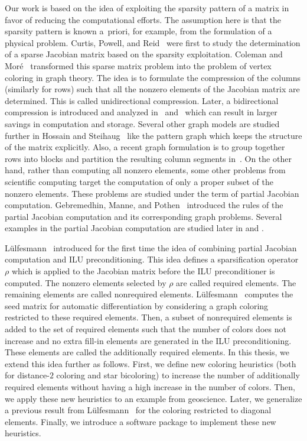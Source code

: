 \documentclass[12pt, twoside,a4paper,toc=bibliography]{scrbook}
\begin{document}
Our work is based on the idea of exploiting the sparsity pattern of a matrix in favor of reducing the
computational efforts. The assumption here is that the sparsity pattern is known a~priori, for
example, from the formulation of a physical problem. Curtis, Powell, and Reid~\cite{Curtis1974117}
were first to study the determination of a sparse Jacobian matrix based on the sparsity exploitation.
Coleman and Mor{\'e}~\cite{Coleman1983EoS} transformed this sparse matrix problem into the
problem of vertex coloring in graph theory. The idea is to formulate the compression of the
columns (similarly for rows) such that all the nonzero elements of the Jacobian matrix are
determined. This is called unidirectional compression. Later, a bidirectional compression is
introduced and analyzed in~\cite{Coleman1996SaE} and~\cite{hs:csj} which can result in larger
savings in computation and storage. Several other graph models are studied further in Hossain and
Steihaug~\cite{hs:gmei} like the pattern graph which keeps the structure of the matrix explicitly.
Also, a recent graph formulation is to group together rows into blocks and partition the resulting
column segments in~\cite{optimal_diret_determination}. On the other hand, rather than computing
all nonzero elements, some other problems from scientific computing target the computation of
only a proper subset of the nonzero elements. These problems are studied under the term of
partial Jacobian computation. Gebremedhin, Manne, and Pothen~\cite{Gebremedhin05whatcolor}
introduced the rules of the partial Jacobian computation and its corresponding graph problems.
Several examples in the partial Jacobian computation are studied later in \cite{CalotoiuMaster} and
\cite{LulfesmannMaster}.

Lülfesmann~\cite{Lulfesmann2012Fap} introduced for the first time the idea of combining partial
Jacobian computation and ILU preconditioning. This idea defines a sparsification operator $\rho$
which is applied to the Jacobian matrix before the ILU preconditioner is computed. The nonzero
elements selected by $\rho$ are called required elements. The remaining elements are called
nonrequired elements. Lülfesmann~\cite{Lulfesmann2012Fap} computes the seed matrix for
automatic differentiation by considering a graph coloring restricted to these required elements.
Then, a subset of nonrequired elements is added to the set of required elements such that the
number of colors does not increase and no extra fill-in elements are generated in the ILU
preconditioning. These elements are called the additionally required elements. In this thesis, we
extend this idea further as follows. First, we define new coloring heuristics (both for distance-$2$
coloring and star bicoloring) to increase the number of additionally required elements without
having a high increase in the number of colors. Then, we apply these new heuristics to an example
from geoscience. Later, we generalize a previous result from Lülfesmann~\cite{Lulfesmann2012Fap}
for the coloring restricted to diagonal elements. Finally, we introduce a software package to
implement these new heuristics.
\end{document}
